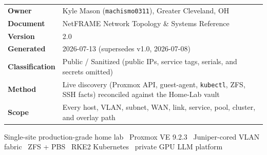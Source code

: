 \documentclass[11pt,letterpaper]{article}
\begin{document}
\begin{titlepage}
\thispagestyle{empty}
\vspace{7cm}

\noindent\begin{tabularx}{\textwidth}{@{}l X@{}}
\toprule
\textbf{Owner} & Kyle Mason (\texttt{machismo0311}), Greater Cleveland, OH \\
\textbf{Document} & NetFRAME Network Topology \& Systems Reference \\
\textbf{Version} & 2.0 \\
\textbf{Generated} & 2026-07-13 (supersedes v1.0, 2026-07-08) \\
\textbf{Classification} & Public / Sanitized (public IPs, service tags, serials, and secrets omitted) \\
\textbf{Method} & Live discovery (Proxmox API, guest-agent, \texttt{kubectl}, ZFS, SSH facts) reconciled against the Home-Lab vault \\
\textbf{Scope} & Every host, VLAN, subnet, WAN, link, service, pool, cluster, and overlay path \\
\bottomrule
\end{tabularx}

\vfill
\begin{center}\small\color{nfslate}
Single-site production-grade home lab \textperiodcentered\ Proxmox VE 9.2.3 \textperiodcentered\ Juniper-cored VLAN fabric \textperiodcentered\ ZFS + PBS \textperiodcentered\ RKE2 Kubernetes \textperiodcentered\ private GPU LLM platform
\end{center}
\end{titlepage}

\tableofcontents
\newpage

\end{document}
